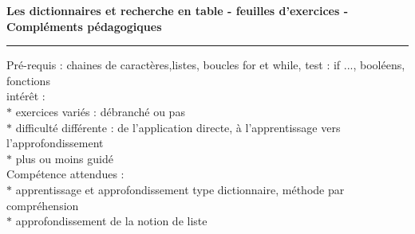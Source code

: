 \documentclass[a4paper,12pt,dvips]{article}
\begin{document}
\begin{center}
\large\textbf{Les dictionnaires et recherche en table - feuilles d'exercices  - Compléments pédagogiques}
\end{center}
 \hrule\vspace{\baselineskip}
 \normalsize
 Pré-requis : chaines de caractères,listes, boucles for et while, test : if ..., booléens, fonctions\\


intérêt :\\
$\ast$ exercices variés : débranché ou pas\\
$\ast$ difficulté différente : de l'application directe, à l'apprentissage vers l'approfondissement\\
$\ast$ plus ou moins guidé \\

Compétence attendues :\\
$\ast$ apprentissage et approfondissement type dictionnaire, méthode par compréhension\\
$\ast$ approfondissement de la notion de liste\\
\end{document}
